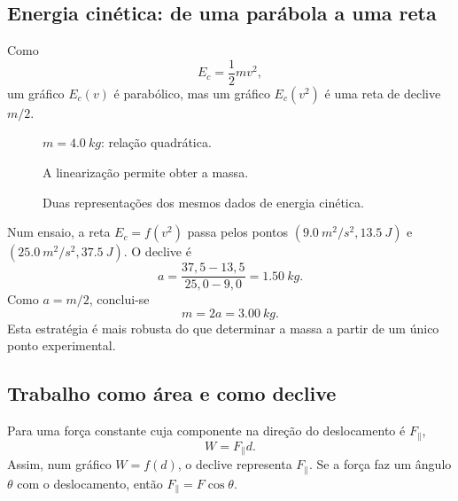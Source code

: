 \documentclass[11pt,a4paper,oneside]{book}
\begin{document}
\subsection*{Energia cinética: de uma parábola a uma reta}
Como
\[
E_c=\frac12mv^2,
\]
um gráfico $E_c(v)$ é parabólico, mas um gráfico $E_c(v^2)$ é uma reta de declive $m/2$.

\begin{figure}[H]
\centering
\begin{minipage}{0.48\textwidth}
\centering
{}
\small $m=\SI{4.0}{kg}$: relação quadrática.
\end{minipage}\hfill
\begin{minipage}{0.48\textwidth}
\centering
{}
\small A linearização permite obter a massa.
\end{minipage}
\caption{Duas representações dos mesmos dados de energia cinética.}
\end{figure}

\begin{exemplo}[title=Exemplo resolvido -- determinar a massa pelo declive]
Num ensaio, a reta $E_c=f(v^2)$ passa pelos pontos $(\SI{9.0}{m^2/s^2},\SI{13.5}{J})$ e $(\SI{25.0}{m^2/s^2},\SI{37.5}{J})$. O declive é
\[
a=\frac{37{,}5-13{,}5}{25{,}0-9{,}0}=\SI{1.50}{kg}.
\]
Como $a=m/2$, conclui-se
\[
m=2a=\SI{3.00}{kg}.
\]
Esta estratégia é mais robusta do que determinar a massa a partir de um único ponto experimental.
\end{exemplo}

\subsection*{Trabalho como área e como declive}
Para uma força constante cuja componente na direção do deslocamento é $F_{\parallel}$,
\[
W=F_{\parallel}d.
\]
Assim, num gráfico $W=f(d)$, o declive representa $F_{\parallel}$. Se a força faz um ângulo $\theta$ com o deslocamento, então $F_{\parallel}=F\cos\theta$.
\end{document}
